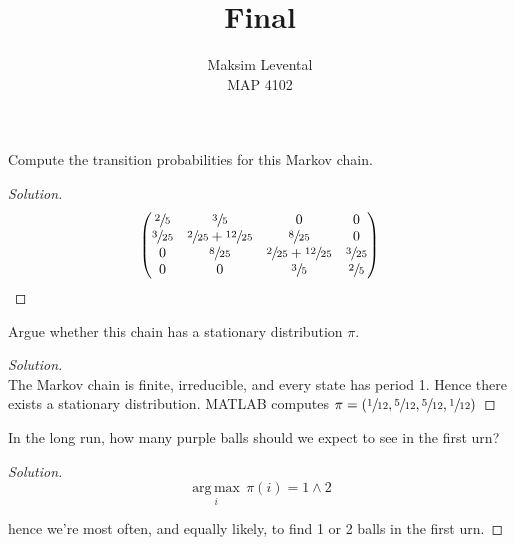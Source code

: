 \documentclass[12pt]{article}
\newenvironment{problem}[2][Problem]{\begin{trivlist}
\item[\hskip \labelsep {\bfseries #1}\hskip \labelsep {\bfseries #2.}]}{\end{trivlist}}
\newenvironment{solution}
  {\begin{proof}[Solution]\renewcommand{\qedsymbol}{}}
  {\end{proof}}
\begin{document}
 
 
\title{Final}%
\author{Maksim Levental\\ %
MAP 4102} %
 
\maketitle
 
\begin{problem}{1(a)}
Compute the transition probabilities for this Markov chain.
\end{problem}
 
\begin{solution}\ \\
$$
\begin{pmatrix}
\sfrac{2}{5} & \sfrac{3}{5} & 0 & 0 \\
\sfrac{3}{25} & \sfrac{2}{25}+\sfrac{12}{25} & \sfrac{8}{25} & 0 \\
0 & \sfrac{8}{25} & \sfrac{2}{25}+\sfrac{12}{25} & \sfrac{3}{25} \\
0 & 0 & \sfrac{3}{5} & \sfrac{2}{5} 
\end{pmatrix}
$$

\end{solution}
\begin{problem}{1(b)}
Argue whether this chain has a stationary distribution $\pi$.
\end{problem}

\begin{solution}\ \\

The Markov chain is finite, irreducible, and every state has period 1. Hence there exists a stationary distribution. MATLAB computes $\pi = (\sfrac{1}{12} ,   \sfrac{5}{12} ,   \sfrac{5}{12}  ,  \sfrac{1}{12})$

\end{solution}

\begin{problem}{1(c)}

In the long run, how many purple balls should we expect to see in the first urn?

\end{problem}

\begin{solution}\ \\
$$
\underset{i}{\operatorname{arg\,max}} \, \pi(i) = 1 \wedge 2
$$ 

hence we're most often, and equally likely, to find 1 or 2 balls in the first urn.

\end{solution}
\end{document}
